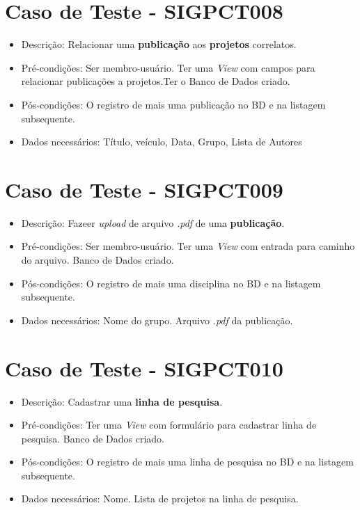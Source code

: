 \documentclass[11pt, a4paper]{book}
\begin{document}
	\section{Caso de Teste - SIGPCT008}
	\begin{itemize}
	\item Descrição: Relacionar uma \textbf{publicação} aos \textbf{projetos} correlatos.
	\item Pré-condições: Ser membro-usuário. Ter uma \emph{View} com campos para relacionar publicações a projetos.Ter o Banco de Dados criado.
	\item Pós-condições: O registro de mais uma publicação no BD e na listagem subsequente.
	\item Dados necessários: Título, veículo, Data, Grupo, Lista de Autores
	\end{itemize}

	\section{Caso de Teste - SIGPCT009}
	\begin{itemize}
	\item Descrição: Fazeer \emph{upload} de arquivo \emph{.pdf} de uma \textbf{publicação}.
	\item Pré-condições: Ser membro-usuário. Ter uma \emph{View} com entrada para caminho do arquivo. Banco de Dados criado.
	\item Pós-condições: O registro de mais uma disciplina no BD e na listagem subsequente.
	\item Dados necessários: Nome do grupo. Arquivo \emph{.pdf} da publicação. 
	\end{itemize}

	\section{Caso de Teste - SIGPCT010}
	\begin{itemize}
	\item Descrição: Cadastrar uma \textbf{linha de pesquisa}.
	\item Pré-condições: Ter uma \emph{View} com formulário para cadastrar linha de pesquisa. Banco de Dados criado.
	\item Pós-condições: O registro de mais uma linha de pesquisa no BD e na listagem subsequente.
	\item Dados necessários: Nome. Lista de projetos na linha de pesquisa.
	\end{itemize}
\end{document}
